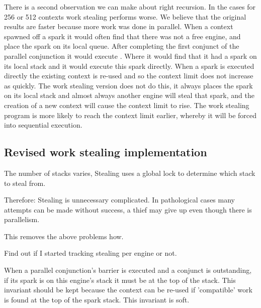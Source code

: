 There is a second observation we can make about right recursion.
In the cases for 256 or 512 contexts work stealing performs worse.
We believe that the original results are faster because more work was done
in parallel.
When a context spawned off a spark it would often find that there was not a
free engine, and place the spark on its local queue.
After completing the first conjunct of the parallel conjunction it would
execute \joinandcontinue.
Where it would find that it had a spark on its local stack and it would
execute this spark directly.
When a spark is executed directly the existing context is re-used and so the
context limit does not increase as quickly.
The work stealing version does not do this,
it always places the spark on its local stack and almost always
another engine will steal that spark,
and the creation of a new context will cause the context limit to rise.
The work stealing program is more likely to reach the context limit earlier,
whereby it will be forced into sequential execution.


\subsection{Revised work stealing implementation}




The number of stacks varies,
Stealing uses a global lock to determine which stack to steal from.

Therefore:
Stealing is unnecessary complicated.
In pathological cases many attempts can be made without success,
a thief may give up even though there is parallelism.

This removes the above problems how.

Find out if I started tracking stealing per engine or not.

When a parallel conjunction's barrier is executed and a conjunct is
outstanding, if its spark is on this engine's stack it must be at the top of
the stack.
This invariant should be kept because the context can be re-used if
'compatible' work is found at the top of the spark stack.
This invariant is soft.

